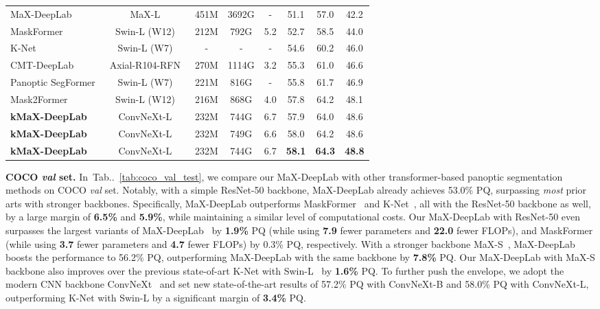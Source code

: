 \documentclass[runningheads]{llncs}
\makeatletter
\DeclareRobustCommand\onedot{\futurelet\@let@token\@onedot}
\def\@onedot{\ifx\@let@token.\else.\null\fi\xspace}
\newcommand{\tabref}[1]{Tab\onedot~\ref{#1}}
\makeatother
\begin{document}
\begin{table*}[!t]
\begin{tabular}{l|c|ccc|ccc}
\hline
MaX-DeepLab~\cite{wang2021max} & MaX-L~\cite{wang2021max} & 451M & 3692G & - & 51.1 & 57.0 & 42.2 \\
MaskFormer~\cite{cheng2021per} & Swin-L (W12)~\cite{liu2021swin} & 212M & 792G & 5.2 & 52.7 & 58.5 & 44.0  \\
K-Net~\cite{zhang2021k} & Swin-L (W7)~\cite{liu2021swin} & - & - & - & 54.6 & 60.2 & 46.0 \\
CMT-DeepLab~\cite{yu2022cmt} & Axial-R104-RFN~\cite{qiao2021detectors} & 270M & 1114G & 3.2 & 55.3 & 61.0 & 46.6 \\
Panoptic SegFormer~\cite{li2021panoptic} & Swin-L (W7)~\cite{liu2021swin} & 221M & 816G & - & 55.8 & 61.7 &  46.9 \\
Mask2Former~\cite{cheng2021masked} & Swin-L (W12)~\cite{liu2021swin} & 216M & 868G & 4.0 & 57.8 & 64.2 &  48.1 \\
\textbf{kMaX-DeepLab} & ConvNeXt-L~\cite{liu2022convnet} & 232M & 744G & 6.7 & 57.9 & 64.0 & 48.6 \\
\textbf{kMaX-DeepLab} & ConvNeXt-L~\cite{liu2022convnet} & 232M & 749G & 6.6 & 58.0 & 64.2 & 48.6 \\
\textbf{kMaX-DeepLab} & ConvNeXt-L~\cite{liu2022convnet} & 232M & 744G & 6.7 & \textbf{58.1} & \textbf{64.3} & \textbf{48.8} \\
\end{tabular}
\label{tab:coco_val_test}
\end{table*}

\textbf{COCO \textit{val} set.}\quad
In~\tabref{tab:coco_val_test}, we compare our MaX-DeepLab with other transformer-based panoptic segmentation methods on COCO \textit{val} set. Notably, with a simple ResNet-50 backbone, MaX-DeepLab already achieves 53.0\% PQ, surpassing \textit{most} prior arts with stronger backbones. Specifically, MaX-DeepLab outperforms MaskFormer~\cite{cheng2021per} and K-Net~\cite{zhang2021k},
all with the ResNet-50 backbone as well, by a large margin of \textbf{6.5\%} and \textbf{5.9\%},
while maintaining a similar level of computational costs.
Our MaX-DeepLab with ResNet-50 even surpasses the largest variants of MaX-DeepLab~\cite{wang2021max} by \textbf{1.9\%} PQ (while using \textbf{7.9} fewer parameters and \textbf{22.0} fewer FLOPs), and MaskFormer (while using \textbf{3.7} fewer parameters and \textbf{4.7} fewer FLOPs) by 0.3\% PQ, respectively.
With a stronger backbone MaX-S~\cite{wang2021max}, MaX-DeepLab boosts the performance to 56.2\% PQ, outperforming MaX-DeepLab with the same backbone by \textbf{7.8\%} PQ.
Our MaX-DeepLab with MaX-S backbone also improves over the previous state-of-art K-Net with Swin-L~\cite{liu2021swin} by \textbf{1.6\%} PQ.
To further push the envelope, we adopt the modern CNN backbone ConvNeXt~\cite{liu2022convnet} and set new state-of-the-art results of 57.2\% PQ with ConvNeXt-B and 58.0\% PQ with ConvNeXt-L, outperforming K-Net with Swin-L by a significant margin of \textbf{3.4\%} PQ.
\end{document}
